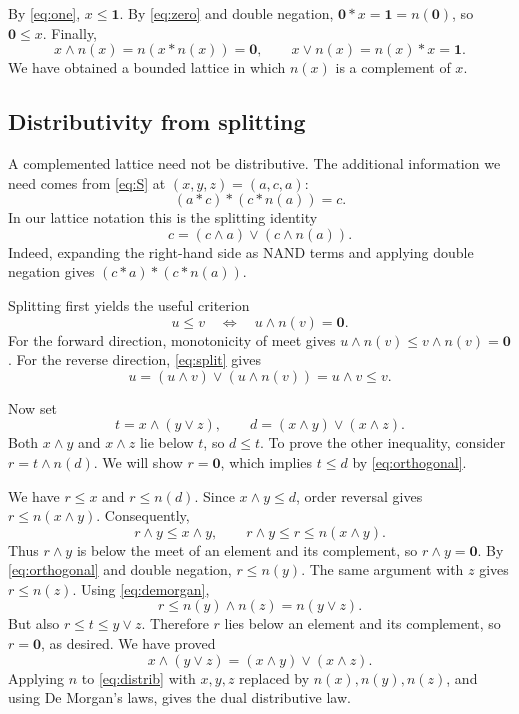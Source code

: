\documentclass[11pt,a4paper]{article}
\newcommand{\one}{\mathbf{1}}
\newcommand{\zero}{\mathbf{0}}
\begin{document}
By \eqref{eq:one}, $x\leq\one$. By \eqref{eq:zero} and double negation,
$\zero*x=\one=n(\zero)$, so $\zero\leq x$.
Finally,
\begin{equation}
 x\wedge n(x)=n(x*n(x))=\zero,\qquad
 x\vee n(x)=n(x)*x=\one.\label{eq:complement}
\end{equation}
We have obtained a bounded lattice in which $n(x)$ is a complement of $x$.

\subsection{Distributivity from splitting}
A complemented lattice need not be distributive. The additional information
we need comes from \eqref{eq:S} at $(x,y,z)=(a,c,a)$:
\[
 (a*c)*(c*n(a))=c.
\]
In our lattice notation this is the splitting identity
\begin{equation}
 \boxed{c=(c\wedge a)\vee(c\wedge n(a)).}\label{eq:split}
\end{equation}
Indeed, expanding the right-hand side as NAND terms and applying double
negation gives $(c*a)*(c*n(a))$.

Splitting first yields the useful criterion
\begin{equation}
 u\leq v\quad\Longleftrightarrow\quad u\wedge n(v)=\zero.
 \label{eq:orthogonal}
\end{equation}
For the forward direction, monotonicity of meet gives
$u\wedge n(v)\leq v\wedge n(v)=\zero$.
For the reverse direction, \eqref{eq:split} gives
\[
 u=(u\wedge v)\vee(u\wedge n(v))=u\wedge v\leq v.
\]

Now set
\[
 t=x\wedge(y\vee z),\qquad
 d=(x\wedge y)\vee(x\wedge z).
\]
Both $x\wedge y$ and $x\wedge z$ lie below $t$, so $d\leq t$.
To prove the other inequality, consider $r=t\wedge n(d)$.
We will show $r=\zero$, which implies $t\leq d$ by
\eqref{eq:orthogonal}.

We have $r\leq x$ and $r\leq n(d)$. Since $x\wedge y\leq d$,
order reversal gives $r\leq n(x\wedge y)$. Consequently,
\[
 r\wedge y\leq x\wedge y,
 \qquad
 r\wedge y\leq r\leq n(x\wedge y).
\]
Thus $r\wedge y$ is below the meet of an element and its complement,
so $r\wedge y=\zero$. By \eqref{eq:orthogonal} and double negation,
$r\leq n(y)$. The same argument with $z$ gives $r\leq n(z)$.
Using \eqref{eq:demorgan},
\[
 r\leq n(y)\wedge n(z)=n(y\vee z).
\]
But also $r\leq t\leq y\vee z$. Therefore $r$ lies below an element
and its complement, so $r=\zero$, as desired.
We have proved
\begin{equation}
 x\wedge(y\vee z)=(x\wedge y)\vee(x\wedge z).\label{eq:distrib}
\end{equation}
Applying $n$ to \eqref{eq:distrib} with $x,y,z$ replaced by
$n(x),n(y),n(z)$, and using De Morgan's laws, gives the dual
distributive law.
\end{document}

